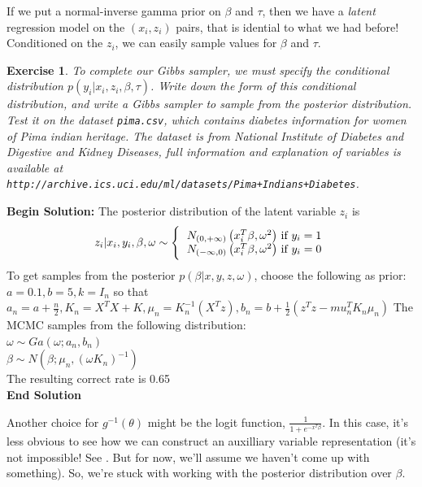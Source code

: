 \documentclass[twoside]{article}
\newcounter{lecnum}
\newtheorem{exercise}{Exercise}[lecnum]
\begin{document}
If we put a normal-inverse gamma prior on $\beta$ and $\tau$, then we have a \textit{latent} regression model on the $(x_i,z_i)$ pairs, that is idential to what we had before! Conditioned on the $z_i$, we can easily sample values for $\beta$ and $\tau$.

\begin{exercise}
  To complete our Gibbs sampler, we must specify the conditional distribution $p(y_i|x_i,z_i,\beta, \tau)$. Write down the form of this conditional distribution, and write a Gibbs sampler to sample from the posterior distribution. Test it on the dataset \texttt{pima.csv}, which contains diabetes information for women of Pima indian heritage. The dataset is from National Institute of Diabetes and Digestive and Kidney Diseases, full information and explanation of variables is available at \texttt{http://archive.ics.uci.edu/ml/datasets/Pima+Indians+Diabetes}.

\end{exercise}

\textbf{Begin Solution:}
The posterior distribution of the latent variable $z_i$ is
\begin{equation*}
z_i|x_i,y_i,\beta,\omega \sim \Bigg\{\begin{tabular}{c} $N_{\left(0,+\infty \right)}\left(x_i^T\beta,\omega^2 \right)$ if $y_i = 1$\\
$N_{\left(-\infty,0 \right)}\left(x_i^T\beta,\omega^2 \right)$ if $y_i = 0$ \end{tabular}
\end{equation*}
To get samples from the posterior $p\left(\beta|x,y,z,\omega \right)$, choose the following as prior:\\
$a = 0.1,b = 5,k=I_n$
so that $a_n = a + \frac{n}{2}, K_n = X^T X + K, \mu_n = K_n^{-1}\left(X^T z \right), b_n = b + \frac{1}{2}\left(z^T z-mu_n^T K_n \mu_n\right)$
The MCMC samples from the following distribution:\\
$\omega \sim Ga\left(\omega;a_n, b_n \right)$\\
$\beta \sim N\left(\beta;\mu_n,\left( \omega K_n\right)^{-1} \right)$\\
The resulting correct rate is 0.65\\
\textbf{End Solution}

Another choice for $g^{-1}(\theta)$ might be the logit function, $\frac{1}{1+e^{-x^T\beta}}$. In this case, it's less obvious to see how we can construct an auxilliary variable representation (it's not impossible! See \citet{PolScoWin2013}. But for now, we'll assume we haven't come up with something). So, we're stuck with working with the posterior distribution over $\beta$.
\end{document}
